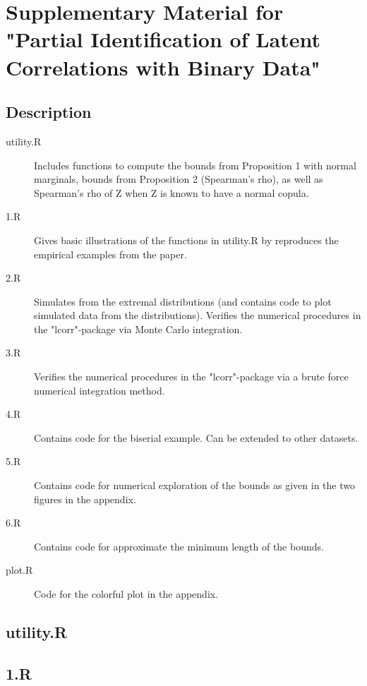 \chapter{Supplementary Material for "Partial Identification of Latent Correlations with Binary Data"}
\section*{Description}

\begin{description}
\item[utility.R] Includes functions to compute the bounds from Proposition 1 with normal marginals, bounds from Proposition 2 (Spearman's rho), as well as Spearman's rho of Z when Z is known to have a normal copula.

\item[1.R] Gives basic illustrations of the functions in utility.R by reproduces the empirical examples from the paper.

\item[2.R] Simulates from the extremal distributions (and contains code to plot simulated data from the distributions). Verifies the numerical procedures in the "lcorr"-package via Monte Carlo integration.

\item[3.R] Verifies the numerical procedures in the "lcorr"-package via a brute force numerical integration method.

\item[4.R]  Contains code for the biserial example. Can be extended to other datasets.

\item[5.R]  Contains code for numerical exploration of the bounds as given in the two figures in the appendix.

\item[6.R]  Contains code for approximate the minimum length of the bounds.

\item[plot.R]  Code for the colorful plot in the appendix.
\end{description}
\section*{utility.R}

\section*{1.R}

